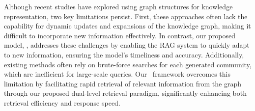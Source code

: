 Although recent studies \cite{edge2024local} have explored using graph structures for knowledge representation, two key limitations persist. First, these approaches often lack the capability for dynamic updates and expansions of the knowledge graph, making it difficult to incorporate new information effectively. In contrast, our proposed model, \model, addresses these challenges by enabling the RAG system to quickly adapt to new information, ensuring the model's timeliness and accuracy. Additionally, existing methods often rely on brute-force searches for each generated community, which are inefficient for large-scale queries. Our \model\ framework overcomes this limitation by facilitating rapid retrieval of relevant information from the graph through our proposed dual-level retrieval paradigm, significantly enhancing both retrieval efficiency and response speed.

\vspace{-0.1in}
